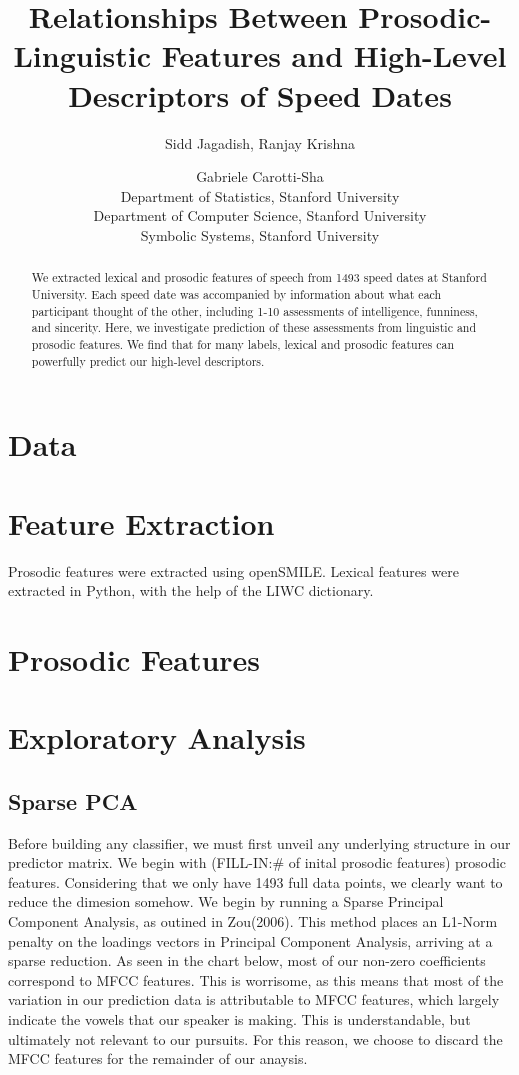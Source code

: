\documentclass[11pt]{article}
\title{Relationships Between Prosodic-Linguistic Features and High-Level Descriptors of Speed Dates}
\author{Sidd Jagadish,  Ranjay Krishna\and Gabriele Carotti-Sha\\
Department of Statistics, Stanford University\\
Department of Computer Science, Stanford University \\
Symbolic Systems, Stanford University
}
\begin{document}
\maketitle

\begin{abstract}
We extracted lexical and prosodic features of speech from 1493 speed dates at Stanford University.  Each speed date was accompanied by information about what each participant thought of the other, including 1-10 assessments of intelligence, funniness, and sincerity.  Here, we investigate prediction of these assessments from linguistic and prosodic features.  We find that for many labels, lexical and prosodic features can powerfully predict our high-level descriptors.
\end{abstract}

\section{Data}

\section{Feature Extraction}
Prosodic features were extracted using openSMILE.  Lexical features were extracted in Python, with the help of the LIWC dictionary.  

\section{Prosodic Features}
 
\section{Exploratory Analysis}
\subsection{Sparse PCA}
Before building any classifier, we must first unveil any underlying structure in our predictor matrix.  We begin with (FILL-IN:\# of inital prosodic features) prosodic features.  Considering that we only have 1493 full data points, we clearly want to reduce the dimesion somehow.  We begin by running a Sparse Principal Component Analysis, as outined in Zou(2006).  This method places an L1-Norm penalty on the loadings vectors in Principal Component Analysis, arriving at a sparse reduction.  As seen in the chart below, most of our non-zero coefficients correspond to MFCC features.  This is worrisome, as this means that most of the variation in our prediction data is attributable to MFCC features, which largely indicate the vowels that our speaker is making.  This is understandable, but ultimately not relevant to our pursuits.  For this reason, we choose to discard the MFCC features for the remainder of our anaysis.
\end{document}
